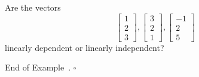 \documentclass[10pt]{article}
\theoremstyle{definition}
\newtheorem{example}[theorem]{Example}
\renewenvironment{example}
{\begin{oldexample}}
  {\par\smallskip\hfill   End of Example~\theexample. $\square$    \par\end{oldexample}}
\begin{document}
\begin{example}
  Are the vectors
  \begin{equation*}
    \begin{bmatrix}
      1\\2\\3
    \end{bmatrix},
    \begin{bmatrix}
      3\\2\\1
    \end{bmatrix},
    \begin{bmatrix}
      -1\\2\\5
    \end{bmatrix}
  \end{equation*}
  linearly dependent or linearly independent?


\end{example}
\end{document}
